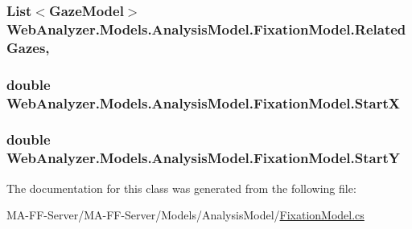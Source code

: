 \subsubsection[{Related\+Gazes}]{\setlength{\rightskip}{0pt plus 5cm}List$<${\bf Gaze\+Model}$>$ Web\+Analyzer.\+Models.\+Analysis\+Model.\+Fixation\+Model.\+Related\+Gazes\hspace{0.3cm}{\ttfamily [get]}, {\ttfamily [set]}}\label{class_web_analyzer_1_1_models_1_1_analysis_model_1_1_fixation_model_a478001ceab5fb747d7d33cbd81382932}
\hypertarget{class_web_analyzer_1_1_models_1_1_analysis_model_1_1_fixation_model_af8b292c9e9e04c3b1b1c617fe3a44e06}{}
\subsubsection[{Start\+X}]{\setlength{\rightskip}{0pt plus 5cm}double Web\+Analyzer.\+Models.\+Analysis\+Model.\+Fixation\+Model.\+Start\+X\hspace{0.3cm}{\ttfamily [get]}}\label{class_web_analyzer_1_1_models_1_1_analysis_model_1_1_fixation_model_af8b292c9e9e04c3b1b1c617fe3a44e06}
\hypertarget{class_web_analyzer_1_1_models_1_1_analysis_model_1_1_fixation_model_a187714460ee0851def122bd776fbda91}{}
\subsubsection[{Start\+Y}]{\setlength{\rightskip}{0pt plus 5cm}double Web\+Analyzer.\+Models.\+Analysis\+Model.\+Fixation\+Model.\+Start\+Y\hspace{0.3cm}{\ttfamily [get]}}\label{class_web_analyzer_1_1_models_1_1_analysis_model_1_1_fixation_model_a187714460ee0851def122bd776fbda91}


The documentation for this class was generated from the following file\+:\begin{DoxyCompactItemize}
\item 
M\+A-\/\+F\+F-\/\+Server/\+M\+A-\/\+F\+F-\/\+Server/\+Models/\+Analysis\+Model/\hyperlink{_fixation_model_8cs}{Fixation\+Model.\+cs}\end{DoxyCompactItemize}
